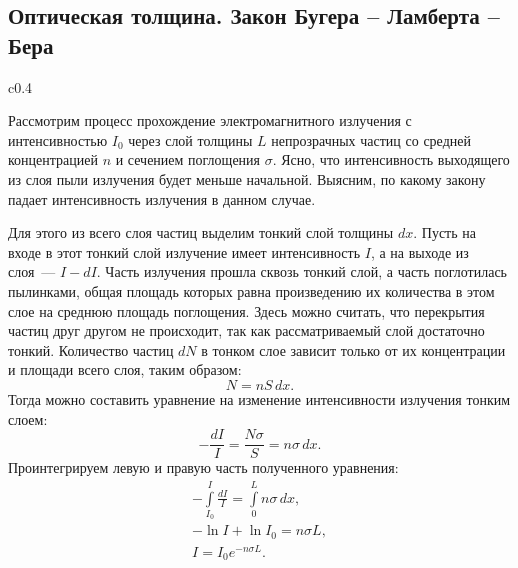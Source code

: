 \subsection{Оптическая толщина. Закон Бугера -- Ламберта -- Бера}
\begin{wrapfigure}[10]{c}{0.4\tw}
	\centering
	\vspace{-1pc}
	\caption{}
	\label{}
\end{wrapfigure}
Рассмотрим процесс прохождение электромагнитного излучения с интенсивностью $I_0$ через слой толщины $L$ непрозрачных частиц со средней концентрацией $n$ и сечением поглощения $\sigma$. Ясно, что интенсивность выходящего из слоя пыли излучения будет меньше начальной. Выясним, по какому закону падает интенсивность излучения в данном случае.

Для этого из всего слоя частиц выделим тонкий слой толщины $dx$. Пусть на входе в этот тонкий слой излучение имеет интенсивность $I$, а на выходе из слоя~--- $I - dI$. Часть излучения прошла сквозь тонкий слой, а часть поглотилась пылинками, общая площадь которых равна произведению их количества в этом слое на среднюю площадь поглощения. Здесь можно считать, что перекрытия частиц друг другом не происходит, так как рассматриваемый слой достаточно тонкий. Количество частиц  $dN$ в тонком слое зависит только от их концентрации и площади всего слоя, таким образом:
\begin{equation*}
	N = n S \,d x.
\end{equation*}
Тогда можно составить уравнение на изменение интенсивности излучения тонким слоем:
\begin{equation*}
	-\frac{dI}{I} = \frac{N\sigma}{S} = n\sigma \,d x.
\end{equation*}
Проинтегрируем левую и правую часть полученного уравнения:
\begin{gather*}
	-\int\limits_{I_0}^{I} \frac{dI}{I} = \int\limits_{0}^{L} n \sigma \,d x,\\
	-\ln I + \ln I_0 = n\sigma L,\\[.5pc]
	I = I_0 e^{-n\sigma L}. \tag{\theequation}
\end{gather*}

